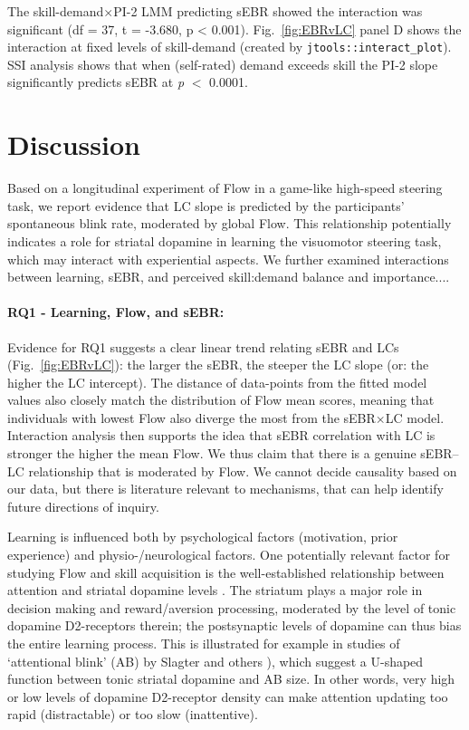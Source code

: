 \documentclass[10pt,letterpaper,floatsintext]{article}
\begin{document}
The skill-demand$\times$PI-2 LMM predicting sEBR showed the interaction was significant (df = 37, t = -3.680, p < 0.001). %
Fig.~\ref{fig:EBRvLC} panel D shows the interaction at fixed levels of skill-demand (created by \verb|jtools::interact_plot|). SSI analysis shows that when (self-rated) demand exceeds skill the PI-2 slope significantly predicts sEBR at {\it p} $<$ 0.0001. %


\section{Discussion}
Based on a longitudinal experiment of Flow in a game-like high-speed steering task, we report evidence that LC slope is predicted by the participants' spontaneous blink rate, moderated by global Flow. This relationship potentially indicates a role for striatal dopamine in learning the visuomotor steering task, which may interact with experiential aspects. We further examined interactions between learning, sEBR, and perceived skill:demand balance and importance....%


\paragraph{RQ1 - Learning, Flow, and sEBR:}
Evidence for RQ1 suggests a clear linear trend relating sEBR and LCs (Fig.~\ref{fig:EBRvLC}): the larger the sEBR, the steeper the LC slope (or: the higher the LC intercept). The distance of data-points from the fitted model values also closely match the distribution of Flow mean scores, meaning that individuals with lowest Flow also diverge the most from the sEBR$\times$LC model. Interaction analysis then supports the idea that sEBR correlation with LC is stronger the higher the mean Flow. We thus claim that there is a genuine sEBR--LC relationship that is moderated by Flow. We cannot decide causality based on our data, but there is literature relevant to mechanisms, that can help identify future directions of inquiry.

Learning is influenced both by psychological factors (motivation, prior experience) and physio-/neurological factors. One potentially relevant factor for studying Flow and skill acquisition is the well-established relationship between attention and striatal dopamine levels \cite{Dreisbach2005}. The striatum plays a major role in decision making and reward/aversion processing, moderated by the level of tonic dopamine D2-receptors therein; the postsynaptic levels of dopamine can thus bias the entire learning process. This is illustrated for example in studies of `attentional blink' (AB) by Slagter and others \cite{Slagter2012,COLZATO2008}), which suggest a U-shaped function between tonic striatal dopamine and AB size. In other words, very high or low levels of dopamine D2-receptor density can make attention updating too rapid (distractable) or too slow (inattentive).
\end{document}
